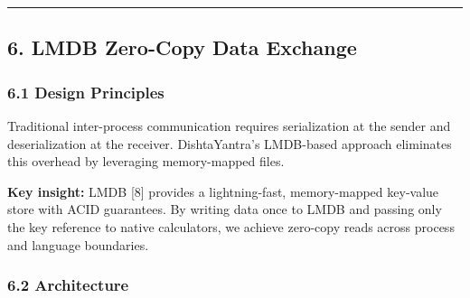 \documentclass[
]{article}
\begin{document}
\begin{center}\rule{0.5\linewidth}{0.5pt}\end{center}

\hypertarget{lmdb-zero-copy-data-exchange}{%
\subsection{6. LMDB Zero-Copy Data
Exchange}\label{lmdb-zero-copy-data-exchange}}

\hypertarget{design-principles}{%
\subsubsection{6.1 Design Principles}\label{design-principles}}

Traditional inter-process communication requires serialization at the
sender and deserialization at the receiver. DishtaYantra's LMDB-based
approach eliminates this overhead by leveraging memory-mapped files.

\textbf{Key insight:} LMDB {[}8{]} provides a lightning-fast,
memory-mapped key-value store with ACID guarantees. By writing data once
to LMDB and passing only the key reference to native calculators, we
achieve zero-copy reads across process and language boundaries.

\hypertarget{architecture}{%
\subsubsection{6.2 Architecture}\label{architecture}}
\end{document}
